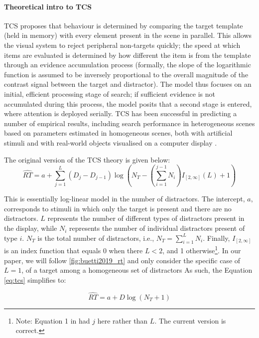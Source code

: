 \documentclass[smallextended, natbib]{svjour3}       %
\begin{document}
\paragraph{Theoretical intro to TCS}
TCS proposes that behaviour is determined by comparing the target template (held in memory) with every element present in the scene in parallel. This allows the visual system to reject peripheral non-targets quickly; the speed at which items are evaluated is determined by how different the item is from the template through an evidence accumulation process (formally, the slope of the logarithmic function is assumed to be inversely proportional to the overall magnitude of the contrast signal between the target and distractor). The model thus focuses on an initial, efficient processing stage of search; if sufficient evidence is not accumulated during this process, the model posits that a second stage is entered, where attention is deployed serially. TCS has been successful in predicting a number of empirical results, including search performance in heterogeneous scenes based on parameters estimated in homogeneous scenes, both with artificial stimuli \cite{buetti2016towards,lleras2019predicting} and with real-world objects visualised on a computer display \cite{wang2017predicting}. 
 
The original version of the TCS theory is given below:
\begin{equation}
\hat{RT} = a + \sum_{j=1}^{L}(D_j-D_{j-1})\log{\left( N_T-\left(\sum_{i=1}^{j-1}N_i\right)I_{[2,\infty]}(L)+1\right)}
\label{eq:tcs}
\end{equation}

This is essentially log-linear model in the number of distractors. The intercept, $a$, corresponds to stimuli in which only the target is present and there are no distractors. $L$ represents the number of different types of distractors present in the display, while $N_i$ represents the number of individual distractors present of type $i$. $N_T$ is the total number of distractors, i.e., $N_T = \sum_{i=1}^{L}N_i$. Finally, $I_{[2, \infty]}$ is an index function that equals 0 when there $L<2$, and 1 otherwise\footnote{Note: Equation 1 in \cite{lleras2020target} had $j$ here rather than $L$. The current version is correct.}. In our paper, we will follow \ref{fig:buetti2019_rt} and only consider the specific case of $L=1$, of a target among a homogeneous set of distractors  As such, the Equation \ref{eq:tcs} simplifies to:

\begin{equation}
\hat{RT} = a + D\log(N_T+1)
\label{eq:loglin}
\end{equation}
\end{document}
